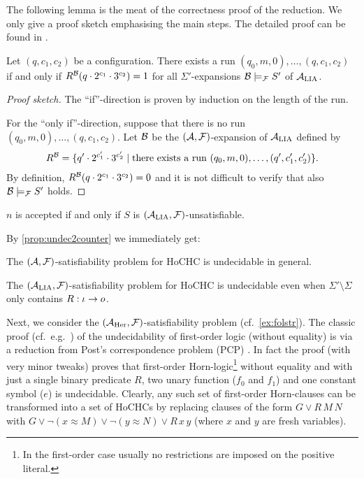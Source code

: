 \documentclass[a4paper,twoside,notitlepage,openright,11pt]{report}
\begin{document}
The following lemma is the meat of the correctness proof of the reduction. We only give a proof sketch emphasising the main steps. The detailed proof can be found in \cite{D72}.
\begin{lemma}
  Let $(q,c_1,c_2)$ be a configuration. There exists a run $(q_0,m,0),\ldots,(q,c_1,c_2)$ if and only if $R^\mathcal B(q\cdot 2^{c_1}\cdot 3^{c_2})=1$ for all $\Sigma'$-expansions $\mathcal B\models_\mathcal F S'$ of $\mathcal A_{\operatorname{LIA}}$.
\end{lemma}
\begin{proof}[Proof sketch]
  The ``if''-direction is proven by induction on the length of the run.

  For the ``only if''-direction, suppose that there is no run $(q_0,m,0),\ldots,(q,c_1,c_2)$. Let $\mathcal B$ be the $(\mathcal A,\mathcal F)$-expansion of $\mathcal A_{\operatorname{LIA}}$ defined by
  \begin{align*}
    R^\mathcal B=\{q'\cdot 2^{c_1'}\cdot 3^{c_2'}\mid\text{there exists a run }(q_0,m,0),\ldots,(q',c'_1,c'_2)\}.
  \end{align*}
  By definition, $R^\mathcal B(q\cdot 2^{c_1}\cdot 3^{c_2})=0$ and it is not difficult to verify that also $\mathcal B\models_\mathcal F S'$ holds.
\end{proof}
\begin{corollary}
  $n$ is accepted if and only if $S$ is $(\mathcal A_{\operatorname{LIA}},\mathcal F)$-unsatisfiable.
\end{corollary}

By \cref{prop:undec2counter} we immediately get:
\begin{theorem}[Undecidability]
  \begin{thmlist}
  \item\label{thm:HoCHCundecgeneral} The $(\mathcal A,\mathcal F)$-satisfiability problem for HoCHC is undecidable in general.
  \item The $(\mathcal A_{\operatorname{LIA}},\mathcal F)$-satisfiability problem for HoCHC is undecidable even when $\Sigma'\setminus\Sigma$ only contains $R:\iota\to o$.
  \end{thmlist}
\end{theorem}

Next, we consider the $(\mathcal A_{\operatorname{Her}},\mathcal F)$-satisfiability problem (cf.\ \cref{ex:folstr}). The classic proof (cf.\ e.g.\ \cite{M03}) of the undecidability of first-order logic (without equality) is via a reduction from Post's correspondence problem (PCP) \cite{P46}. In fact the proof (with very minor tweaks) proves that first-order Horn-logic\footnote{In the first-order case usually no restrictions are imposed on the positive literal.} without equality and with just a single binary predicate $R$, two unary function ($f_0$ and $f_1$) and one constant symbol ($e$) is undecidable. Clearly, any such set of first-order Horn-clauses can be transformed into a set of HoCHCs by replacing clauses of the form $G\lor R\,M\,N$ with $G\lor\neg (x\approx M)\lor\neg(y\approx N)\lor R\,x\,y$ (where $x$ and $y$ are fresh variables).
\end{document}
